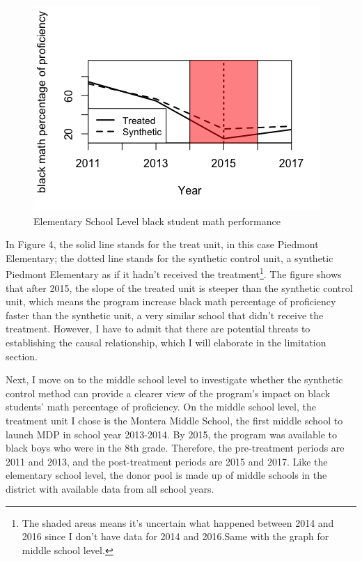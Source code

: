 \begin{figure}[H]
  \includegraphics[width=\linewidth]{elementary1.png}
  \caption{Elementary School Level black student math performance}
  \label{fig:boat1}
\end{figure}

In Figure 4, the solid line stands for the treat unit, in this case Piedmont Elementary; the dotted line stands for the synthetic control unit, a synthetic Piedmont Elementary as if it hadn't received the treatment\footnote{The shaded areas means it's uncertain what happened between 2014 and 2016 since I don't have data for 2014 and 2016.Same with the graph for middle school level.}. The figure shows that after 2015, the slope of the treated unit is steeper than the synthetic control unit, which means the program increase black math percentage of proficiency faster than the synthetic unit, a very similar school that didn't receive the treatment. However, I have to admit that there are potential threats to establishing the causal relationship, which I will elaborate in the limitation section.

Next, I move on to the middle school level to investigate whether the synthetic control method can provide a clearer view of the program's impact on black students' math percentage of proficiency. On the middle school level, the treatment unit I chose is the Montera Middle School, the first middle school to launch MDP in school year 2013-2014. By 2015, the program was available to black boys who were in the 8th grade. Therefore, the pre-treatment periods are 2011 and 2013, and the post-treatment periods are 2015 and 2017. Like the elementary school level, the donor pool is made up of middle schools in the district with available data from all school years. 

